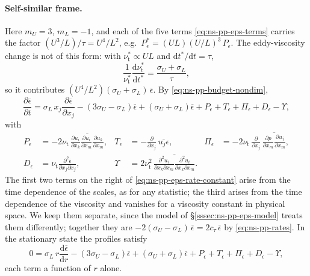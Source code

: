 \documentclass{article}
\begin{document}
\paragraph{Self-similar frame.}
Here $m_U = 3$, $m_L = -1$, and each of the five terms
\eqref{eq:ns-pp-eps-terms} carries the factor $(U^3/L)/\tau = U^4/L^2$, e.g.\
$P_\epsilon^* = (UL)(U/L)^3\, P_\epsilon$. The eddy-viscosity change is not of
this form: with $\nu_{\mathrm{t}}^* \propto UL$ and
$\mathrm{d}t^*/\mathrm{d}t = \tau$,
\begin{equation}\label{eq:ns-pp-eps-nut-rate}
  \frac{1}{\nu_{\mathrm{t}}^*}\frac{\mathrm{d}\nu_{\mathrm{t}}^*}{\mathrm{d}t^*}
  = \frac{\sigma_U + \sigma_L}{\tau} ,
\end{equation}
so it contributes $(U^4/L^2)(\sigma_U + \sigma_L)\, \overline{\epsilon}$.
By \eqref{eq:ns-pp-budget-nondim},
\begin{equation}\label{eq:ns-pp-eps-rate-constant}
  \frac{\partial \overline{\epsilon}}{\partial t}
  = \sigma_L\, x_j \frac{\partial \overline{\epsilon}}{\partial x_j}
  - \left( 3\sigma_U - \sigma_L \right) \overline{\epsilon}
  + \left( \sigma_U + \sigma_L \right) \overline{\epsilon}
  + P_\epsilon + T_\epsilon + \Pi_\epsilon + D_\epsilon - \Upsilon ,
\end{equation}
with
\begin{equation}\label{eq:ns-pp-eps-terms-nondim}
\begin{aligned}
  P_\epsilon &= -2\nu_{\mathrm{t}}\, \overline{\frac{\partial u_i}{\partial x_k} \frac{\partial u_i}{\partial x_m} \frac{\partial u_k}{\partial x_m}},
  &
  T_\epsilon &= -\frac{\partial}{\partial x_j}\, \overline{u_j \epsilon},
  &
  \Pi_\epsilon &= -2\nu_{\mathrm{t}}\, \frac{\partial}{\partial x_j}\, \overline{\frac{\partial p}{\partial x_m} \frac{\partial u_j}{\partial x_m}},
  \\
  D_\epsilon &= \nu_{\mathrm{t}} \frac{\partial^2 \overline{\epsilon}}{\partial x_j \partial x_j},
  &
  \Upsilon &= 2 \nu_{\mathrm{t}}^2\, \overline{\frac{\partial^2 u_i}{\partial x_k \partial x_m} \frac{\partial^2 u_i}{\partial x_k \partial x_m}} .
\end{aligned}
\end{equation}
The first two terms on the right of \eqref{eq:ns-pp-eps-rate-constant} arise
from the time dependence of the scales, as for any statistic; the third
arises from the time dependence of the viscosity and vanishes for a viscosity
constant in physical space. We keep them separate, since the model of
\S\ref{sssec:ns-pp-eps-model} treats them differently; together they are
$-2(\sigma_U - \sigma_L)\, \overline{\epsilon} = 2 c_\tau\, \overline{\epsilon}$
by \eqref{eq:ns-pp-rates}. In the stationary state the profiles satisfy
\begin{equation}\label{eq:ns-pp-eps-radial}
  0 = \sigma_L\, r \frac{\mathrm{d} \overline{\epsilon}}{\mathrm{d} r}
  - \left( 3\sigma_U - \sigma_L \right) \overline{\epsilon}
  + \left( \sigma_U + \sigma_L \right) \overline{\epsilon}
  + P_\epsilon + T_\epsilon + \Pi_\epsilon + D_\epsilon - \Upsilon ,
\end{equation}
each term a function of $r$ alone.
\end{document}
